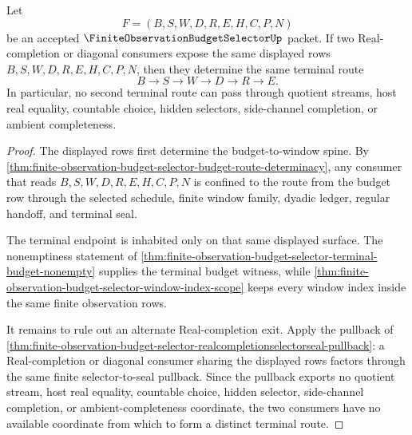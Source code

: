 \begin{theorem}
\label{thm:finite-observation-budget-selector-terminal-route-no-branching}
Let
$$
F=(B,S,W,D,R,E,H,C,P,N)
$$
be an accepted $\FiniteObservationBudgetSelectorUp$ packet. If two Real-completion or diagonal consumers expose the same displayed rows $B,S,W,D,R,E,H,C,P,N$, then they determine the same terminal route
$$
B \to S \to W \to D \to R \to E.
$$
In particular, no second terminal route can pass through quotient streams, host real equality, countable choice, hidden selectors, side-channel completion, or ambient completeness.
\end{theorem}
\begin{proof}
The displayed rows first determine the budget-to-window spine. By \autoref{thm:finite-observation-budget-selector-budget-route-determinacy}, any consumer that reads $B,S,W,D,R,E,H,C,P,N$ is confined to the route from the budget row through the selected schedule, finite window family, dyadic ledger, regular handoff, and terminal seal.

The terminal endpoint is inhabited only on that same displayed surface. The nonemptiness statement of \autoref{thm:finite-observation-budget-selector-terminal-budget-nonempty} supplies the terminal budget witness, while \autoref{thm:finite-observation-budget-selector-window-index-scope} keeps every window index inside the same finite observation rows.

It remains to rule out an alternate Real-completion exit. Apply the pullback of \autoref{thm:finite-observation-budget-selector-realcompletionselectorseal-pullback}: a Real-completion or diagonal consumer sharing the displayed rows factors through the same finite selector-to-seal pullback. Since the pullback exports no quotient stream, host real equality, countable choice, hidden selector, side-channel completion, or ambient-completeness coordinate, the two consumers have no available coordinate from which to form a distinct terminal route.
\end{proof}

